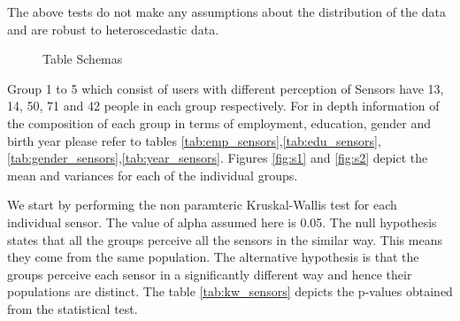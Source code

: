 The above tests do not make any assumptions about the distribution of the data and are robust to heteroscedastic data.
\begin{figure}[htp]
\caption{Table Schemas}
\label{fig:s3}
\end{figure}

Group 1 to 5 which consist of users with different perception of Sensors have 13, 14, 50, 71 and 42 people in each group respectively. For in depth information of the composition of each group in terms of employment, education, gender and birth year please refer to tables
\ref{tab:emp_sensors},\ref{tab:edu_sensors},\ref{tab:gender_sensors},\ref{tab:year_sensors}. Figures \ref{fig:s1} and \ref{fig:s2} depict the mean and variances for each of the individual groups. 

We start by performing the non paramteric Kruskal-Wallis test for each individual sensor. The value of alpha assumed here is 0.05. The null hypothesis states that all the groups perceive all the sensors in the similar way. This means they come from the same population. The alternative hypothesis is
that the groups perceive each sensor in a significantly different way and hence their populations are distinct. The table \ref{tab:kw_sensors} depicts the p-values obtained from the statistical test.

